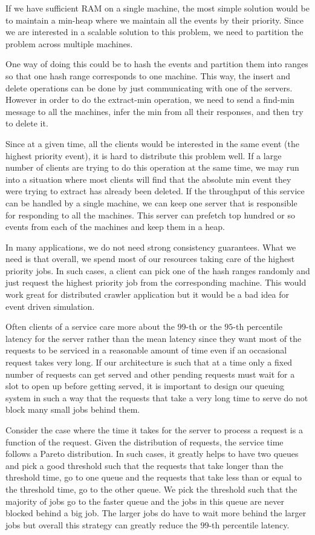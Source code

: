 If we have sufficient RAM on a single machine, the most simple
solution would be to maintain a min-heap where we maintain
all the events by their priority.  Since we are interested in a
scalable solution to this problem, we need to partition the problem
across multiple machines. 

One way of doing this could be to hash the
events and partition them into ranges so that one hash range
corresponds to one machine. This way, the insert and delete operations can
be done by just communicating with one of the servers. However in
order to do the extract-min operation, we need to send a find-min
message to all the machines, infer the min from all their
responses, and then try to delete it. 

Since at a given time, all the clients would be interested in the same
event (the highest priority event), it is hard to distribute this
problem well.
If a large number of clients are
trying to do this operation at the same time, we may run into a
situation where most clients will find that the absolute min event they were
trying to extract has already been deleted. If the throughput of this
service can be handled by a single machine, we can keep one server
that is responsible for responding to all the machines. This
server can prefetch top hundred or so events from each of the machines
and keep them in a heap.

In many applications, we do not need strong consistency guarantees. What we need is that overall, we spend most of our resources taking care of the highest priority jobs. In such cases, a client can pick one of the hash ranges randomly
and just request the highest priority job from the corresponding
machine. This would work great for distributed crawler application but
it would be a bad idea for event driven simulation.


Often clients of a service care more about the $99$-th or the $95$-th
percentile latency for the server rather than the mean latency since they want
most of the requests to be serviced in a reasonable amount of time even if an
occasional request takes very long. If our architecture is such that
at a time only a fixed number of requests can get served and other
pending requests must wait for a slot to open up before getting
served, it is important to design our queuing system in such a way
that the requests that take a very long time to serve do not block many small
jobs behind them.

Consider the case where the time it takes for the server to process a
request is a function of the request. Given the
distribution of requests, the service time follows a Pareto distribution. In
such cases, it greatly helps to have two queues and pick a good
threshold such that the requests that take longer than the threshold
time, go to one queue and the requests that take less than or equal to
the threshold time, go to the other queue. We pick the threshold such that
the majority of jobs go to the faster queue and the jobs in this queue
are never blocked behind a big job.  The larger jobs do have to wait
more behind the larger jobs but overall this strategy can greatly
reduce the $99$-th percentile latency.

